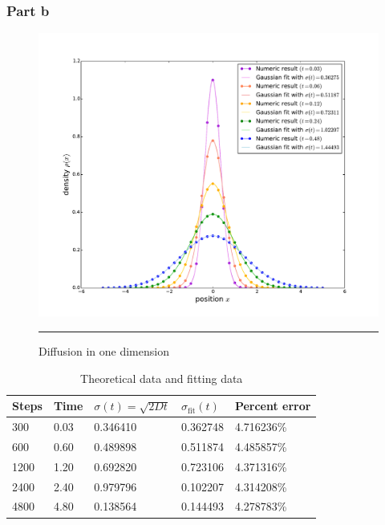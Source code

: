 \documentclass[notitlepage,aps,prd,nofootinbib]{revtex4-1}
\begin{document}
\newpage
\subsubsection{Part b}
\label{subsubsec:results_2_b}
\begin{figure}[!htbc]
  \centering
  \includegraphics[width=.6\textwidth]{../output/plots_for_paper/problem_2/part_b.pdf}
  	{\par\nobreak\rule[9pt]{35em}{0.5pt}\vspace{-5mm}}
	\caption{Diffusion in one dimension}
	\label{fig:2}
\end{figure}

\begin{center}
	\begin{table}[!htbc]
		\begin{tabular}{ | p{2cm} | p{2cm} | p{2cm} | p{2cm} | p{2cm} |}
			\hline
			Steps & Time & $\sigma(t) = \sqrt{2Dt}$ & $\sigma_{\mathrm{fit}}(t)$ & Percent error\\
			\hline
			300  & 0.03 & 0.346410 & 0.362748 & 4.716236\%\\
			\hline
			600  & 0.60 & 0.489898 & 0.511874 & 4.485857\%\\ 
			\hline
			1200 & 1.20 & 0.692820 & 0.723106 & 4.371316\%\\
			\hline
			2400 & 2.40 & 0.979796 & 0.102207 & 4.314208\%\\
			\hline
			4800 & 4.80 & 0.138564 & 0.144493 & 4.278783\%\\
			\hline
		\end{tabular}
		\caption{Theoretical data and fitting data}
		\label{table:prob_2}
	\end{table}
\end{center}

\clearpage
\end{document}
